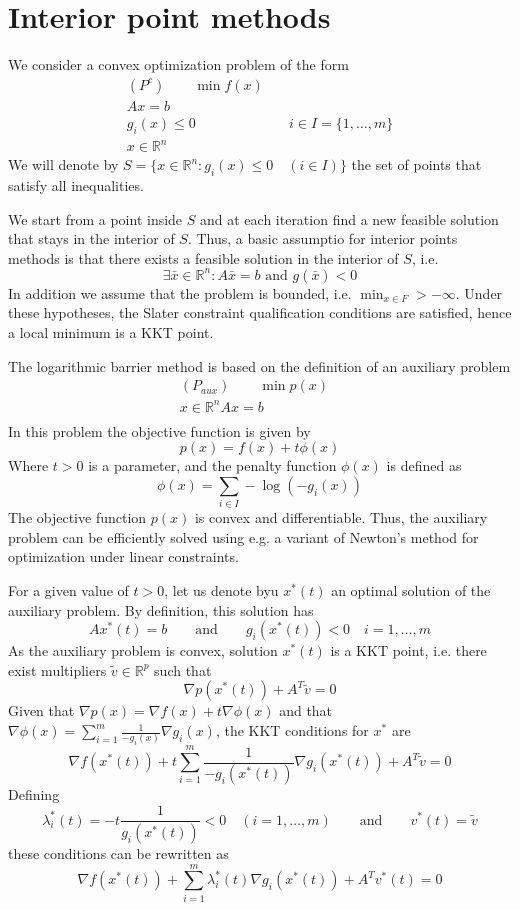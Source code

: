 \documentclass{book}
\newcommand{\R}{\mathbb{R}}
\theoremstyle{theoremv2}
\theoremstyle{defv2}
\theoremstyle{remark}
\theoremstyle{remark}
\begin{document}
\section{Interior point methods}
We consider a convex optimization problem of the form 
\begin{align*}
    (P^c) \qquad \min f(x)&\\
    Ax=b &\\
    g_i(x)\leq 0& \quad i\in I=\{1,\dots,m\}\\ 
    x\in\R^n
\end{align*}
We will denote by $S=\{ x\in\R^n : g_i(x)\leq 0 \quad (i\in I) \}$ the set of points that satisfy all inequalities.

We start from a point inside $S$ and at each iteration find a new feasible solution that stays in the interior of $S$. Thus, a basic assumptio for interior points methods is that there exists a feasible solution in the interior of $S$, i.e. 
\[
    \exists \bar{x}\in\R^n:A\bar{x}=b \text{ and } g(\bar{x})<0
\]
In addition we assume that the problem is bounded, i.e. $\min_{x \in F}>-\infty$. Under these hypotheses, the Slater constraint qualification conditions are satisfied, hence a local minimum is a KKT point.

The logarithmic barrier method is based on the definition of an auxiliary problem 
\begin{align*}
    (P_{aux}) \qquad \min p(x)&\\
    x\in\R^n
    Ax=b &\\
\end{align*}
In this problem the objective function is given by 
\[
    p(x) = f(x)+t\phi(x)
\]
Where $t>0$ is a parameter, and the penalty function $\phi(x)$ is defined as 
\[
    \phi(x) = \displaystyle\sum_{i\in I} -\log(-g_i(x))
\]
The objective function $p(x)$ is convex and differentiable. Thus, the auxiliary problem can be efficiently solved using e.g. a variant of Newton's method for optimization under linear constraints.

For a given value of $t>0$, let us denote byu $x^*(t)$ an optimal solution of the auxiliary problem. By definition, this solution has 
\[
    Ax^*(t) = b \qquad \text{and}\qquad g_i(x^*(t))<0\quad i=1,\dots,m
\]
As the auxiliary problem is convex, solution $x^*(t)$ is a KKT point, i.e. there exist multipliers $\tilde{v}\in\R^p$ such that 
\[
    \nabla p(x^*(t)) + A^T\tilde{v}=0
\]
Given that $\nabla p(x) = \nabla f(x) + t\nabla \phi(x)$ and that $\nabla \phi(x)=\displaystyle\sum_{i=1}^{m} \displaystyle\frac{1}{-g_i(x)}\nabla g_i(x)$, the KKT conditions for $x^*$ are 
\[
    \nabla f(x^*(t)) + t \displaystyle\sum_{i=1}^{m}\displaystyle\frac{1}{-g_i(x^*(t))}\nabla g_i(x^*(t))+A^T\tilde{v}=0
\]
Defining
\[
    \lambda_i^*(t) = -t \displaystyle\frac{1}{g_i(x^*(t))}<0 \quad (i=1,\dots,m) \qquad \text{and} \qquad v^*(t)=\tilde{v}
\]
these conditions can be rewritten as 
\begin{equation}\label{17}
    \nabla f(x^*(t))  + \displaystyle\sum_{i=1}^{m}\lambda_i^*(t)\nabla g_i(x^*(t)) + A^Tv^*(t) = 0
\end{equation}
\end{document}
